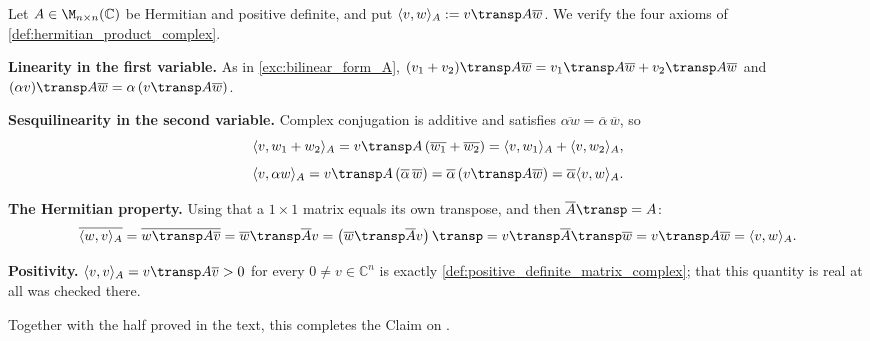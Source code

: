 \begin{exercisesolution}
\label{sol:pos_def_gives_hermitian_product}
  Let $A \in \M_{n \times n}(\mathbb{C})$ be Hermitian and positive definite, and put $\langle v, w \rangle_A := v\transp A \overline{w}$. We verify the four axioms of \cref{def:hermitian_product_complex}.

  \textbf{Linearity in the first variable.} As in \cref{exc:bilinear_form_A}, $(v_1 + v_2)\transp A \overline{w} = v_1\transp A \overline{w} + v_2\transp A \overline{w}$ and $(\alpha v)\transp A \overline{w} = \alpha \left( v\transp A \overline{w} \right)$.

  \textbf{Sesquilinearity in the second variable.} Complex conjugation is additive and satisfies $\overline{\alpha w} = \overline{\alpha} \, \overline{w}$, so
  \[ \langle v, w_1 + w_2 \rangle_A = v\transp A \left( \overline{w_1} + \overline{w_2} \right) = \langle v, w_1 \rangle_A + \langle v, w_2 \rangle_A, \]
  \[ \langle v, \alpha w \rangle_A = v\transp A \left( \overline{\alpha} \, \overline{w} \right) = \overline{\alpha} \left( v\transp A \overline{w} \right) = \overline{\alpha} \langle v, w \rangle_A. \]

  \textbf{The Hermitian property.} Using that a $1 \times 1$ matrix equals its own transpose, and then $\overline{A}\transp = A$:
  \[ \overline{\langle w, v \rangle_A} = \overline{w\transp A \overline{v}} = \overline{w}\transp \overline{A} v = \left( \overline{w}\transp \overline{A} v \right)\transp = v\transp \overline{A}\transp \overline{w} = v\transp A \overline{w} = \langle v, w \rangle_A. \]

  \textbf{Positivity.} $\langle v, v \rangle_A = v\transp A \overline{v} > 0$ for every $0 \ne v \in \mathbb{C}^n$ is exactly \cref{def:positive_definite_matrix_complex}; that this quantity is real at all was checked there.

  Together with the half proved in the text, this completes the Claim on .
\end{exercisesolution}

